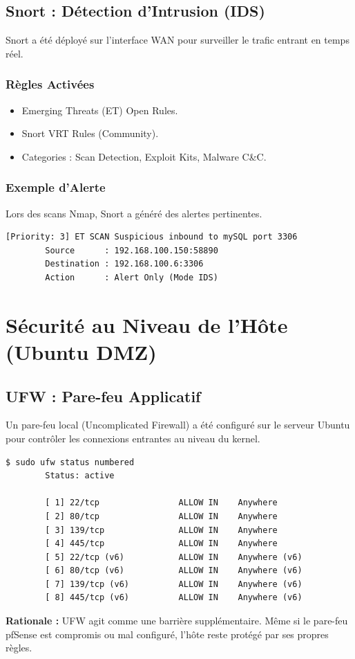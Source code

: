 \documentclass[12pt,a4paper,openany]{report}
\begin{document}
	\section{Snort : Détection d'Intrusion (IDS)}
	Snort a été déployé sur l'interface WAN pour surveiller le trafic entrant en temps réel.
	
	\subsection{Règles Activées}
	\begin{itemize}
		\item Emerging Threats (ET) Open Rules.
		\item Snort VRT Rules (Community).
		\item Categories : Scan Detection, Exploit Kits, Malware C\&C.
	\end{itemize}
	
	\subsection{Exemple d'Alerte}
	Lors des scans Nmap, Snort a généré des alertes pertinentes.
	\begin{lstlisting}[caption=Exemple d'alerte Snort]
		[Priority: 3] ET SCAN Suspicious inbound to mySQL port 3306
		Source      : 192.168.100.150:58890
		Destination : 192.168.100.6:3306
		Action      : Alert Only (Mode IDS)
	\end{lstlisting}
	
	\chapter{Sécurité au Niveau de l'Hôte (Ubuntu DMZ)}
	
	\section{UFW : Pare-feu Applicatif}
	Un pare-feu local (Uncomplicated Firewall) a été configuré sur le serveur Ubuntu pour contrôler les connexions entrantes au niveau du kernel.
	
	\begin{lstlisting}[caption=Configuration UFW sur Ubuntu DMZ]
		$ sudo ufw status numbered
		Status: active
		
		[ 1] 22/tcp                ALLOW IN    Anywhere
		[ 2] 80/tcp                ALLOW IN    Anywhere
		[ 3] 139/tcp               ALLOW IN    Anywhere
		[ 4] 445/tcp               ALLOW IN    Anywhere
		[ 5] 22/tcp (v6)           ALLOW IN    Anywhere (v6)
		[ 6] 80/tcp (v6)           ALLOW IN    Anywhere (v6)
		[ 7] 139/tcp (v6)          ALLOW IN    Anywhere (v6)
		[ 8] 445/tcp (v6)          ALLOW IN    Anywhere (v6)
	\end{lstlisting}
	\textbf{Rationale :} UFW agit comme une barrière supplémentaire. Même si le pare-feu pfSense est compromis ou mal configuré, l'hôte reste protégé par ses propres règles.
	
\end{document}
